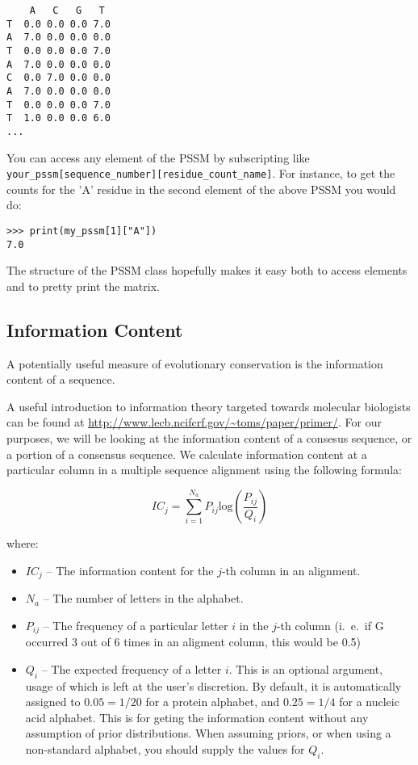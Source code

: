 \begin{verbatim}
    A   C   G   T
T  0.0 0.0 0.0 7.0
A  7.0 0.0 0.0 0.0
T  0.0 0.0 0.0 7.0
A  7.0 0.0 0.0 0.0
C  0.0 7.0 0.0 0.0
A  7.0 0.0 0.0 0.0
T  0.0 0.0 0.0 7.0
T  1.0 0.0 0.0 6.0
...
\end{verbatim}

You can access any element of the PSSM by subscripting like \verb|your_pssm[sequence_number][residue_count_name]|. For instance, to get the counts for the 'A' residue in the second element of the above PSSM you would do:

\begin{verbatim}
>>> print(my_pssm[1]["A"])
7.0
\end{verbatim}

The structure of the PSSM class hopefully makes it easy both to access elements and to pretty print the matrix.

\subsection{Information Content}
\label{sec:getting_info_content}

A potentially useful measure of evolutionary conservation is the information content of a sequence.

A useful introduction to information theory targeted towards molecular biologists can be found at \url{http://www.lecb.ncifcrf.gov/~toms/paper/primer/}. For our purposes, we will be looking at the information content of a consesus sequence, or a portion of a consensus sequence. We calculate information content at a particular column in a multiple sequence alignment using the following formula:

\begin{displaymath}
IC_{j} = \sum_{i=1}^{N_{a}} P_{ij} \mathrm{log}\left(\frac{P_{ij}}{Q_{i}}\right)
\end{displaymath}

\noindent where:

\begin{itemize}
  \item $IC_{j}$ -- The information content for the $j$-th column in an alignment.
  \item $N_{a}$ -- The number of letters in the alphabet.
  \item $P_{ij}$ -- The frequency of a particular letter $i$ in the $j$-th column (i.~e.~if G occurred 3 out of 6 times in an aligment column, this would be 0.5)
  \item $Q_{i}$ --  The expected frequency of a letter $i$. This is an
  optional argument, usage of which is left at the user's
  discretion. By default, it is automatically assigned to $0.05 = 1/20$ for a
  protein alphabet, and $0.25 = 1/4$ for a nucleic acid alphabet. This is for
  geting the information content without any assumption of prior
  distributions. When assuming priors, or when using a non-standard
  alphabet, you should supply the values for $Q_{i}$.
\end{itemize}

